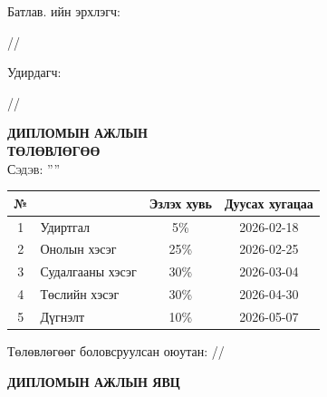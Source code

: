 
\begin{titlepage}

\vspace*{0.5cm}
Батлав. \deptname{}ийн эрхлэгч:
\begin{flushright}
\makebox[4cm]{\dotfill} /\chairname/ 
\end{flushright}

Удирдагч: 
\begin{flushright}
\makebox[4cm]{\dotfill} /\supname/
\end{flushright}

\begin{center}

\vspace*{2cm}
\textbf{{\large ДИПЛОМЫН АЖЛЫН \\ ТӨЛӨВЛӨГӨӨ}}\\[0.5cm]

\textsc{\large Сэдэв: ''\ttitle''}\\[0.5cm]

\begin{tabular}{|c|p{7cm}|c|c|}
	\hline
	№ & \makebox[7cm][c]{Ажлын бүлэг, хэсгийн нэр} & Эзлэх хувь & Дуусах хугацаа \\ \hline
	1 & {Удиртгал} &  5\% & 2026-02-18 \\ \hline
	2 & {Онолын хэсэг} & 25\% & 2026-02-25 \\ \hline
	3 & {Судалгааны хэсэг} & 30\% & 2026-03-04 \\ \hline
	4 & {Төслийн хэсэг} & 30\% & 2026-04-30 \\ \hline
	5 & {Дүгнэлт} & 10\% & 2026-05-07 \\ \hline
\end{tabular}

\vspace{2cm}
Төлөвлөгөөг боловсруулсан оюутан: \makebox[3cm]{\dotfill} /\shortname/

\end{center}

\newpage

\begin{center}

\vspace*{2cm}
\textbf{{\large ДИПЛОМЫН АЖЛЫН ЯВЦ}}\\[0.5cm]


\end{center}
\end{titlepage}
